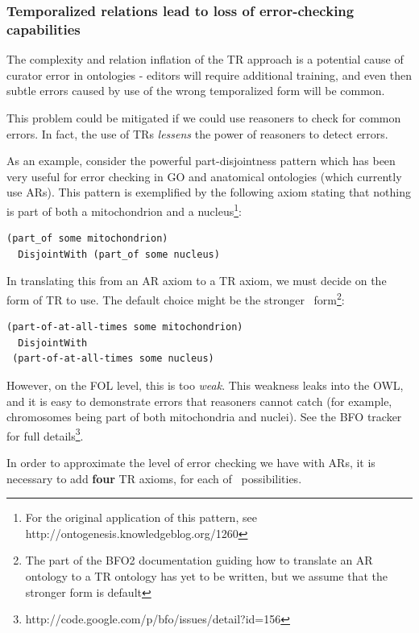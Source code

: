 \documentclass{bioinfo}
\def\atAllTimes{\pr{at-all-times}}
\begin{document}
\subsubsection{Temporalized relations lead to loss of error-checking
  capabilities}

The complexity and relation inflation of the TR approach is a
potential cause of curator error in ontologies - editors will require
additional training, and even then subtle errors caused by use of the
wrong temporalized form will be common.

This problem could be mitigated if we could use reasoners to check for
common errors. In fact, the use of TRs \emph{lessens} the power of
reasoners to detect errors.

As an example, consider the powerful part-disjointness
pattern\cite{PD} which has been very useful for error checking in GO
and anatomical ontologies (which currently use ARs). This pattern is
exemplified by the following axiom stating that nothing is part of
both a mitochondrion and a nucleus\footnote{For the original
  application of this pattern, see
  http://ontogenesis.knowledgeblog.org/1260}:

\begin{verbatim}
(part_of some mitochondrion) 
  DisjointWith (part_of some nucleus)
\end{verbatim}

In translating this from an AR axiom to a TR axiom, we must decide on
the form of TR to use. The default choice might be the stronger
\atAllTimes\ form\footnote{The part of the BFO2 documentation guiding
  how to translate an AR ontology to a TR ontology has yet to be
  written, but we assume that the stronger form is default}:

\begin{verbatim}
(part-of-at-all-times some mitochondrion) 
  DisjointWith
 (part-of-at-all-times some nucleus)
\end{verbatim}

However, on the FOL level, this is too \emph{weak}. This weakness
leaks into the OWL, and it is easy to demonstrate errors that
reasoners cannot catch (for example, chromosomes being part of both
mitochondria and nuclei). See the BFO tracker for full
details\footnote{http://code.google.com/p/bfo/issues/detail?id=156}.

In order to approximate the level of error checking we have with ARs,
it is necessary to add \textbf{four} TR axioms, for each of \atAllTimes\
possibilities.
\end{document}
